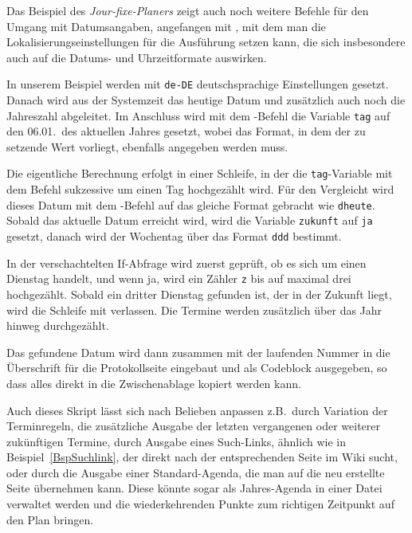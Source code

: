 Das Beispiel des \emph{Jour-fixe-Planers} zeigt auch noch weitere Befehle für den Umgang mit Datumsangaben, angefangen mit , mit dem man die Lokalisierungseinstellungen für die Ausführung setzen kann, die sich insbesondere auch auf die Datums- und Uhrzeitformate auswirken.

In unserem Beispiel werden mit \verb|de-DE| deutschsprachige Einstellungen gesetzt. Danach wird aus der Systemzeit das heutige Datum und zusätzlich auch noch die Jahreszahl abgeleitet. Im Anschluss wird mit dem -Befehl die Variable \verb|tag| auf den 06.01.\ des aktuellen Jahres gesetzt, wobei das Format, in dem der zu setzende Wert vorliegt, ebenfalls angegeben werden muss.

Die eigentliche Berechnung erfolgt in einer Schleife, in der die \verb|tag|-Variable mit dem Befehl  sukzessive um einen Tag hochgezählt wird. Für den Vergleicht wird dieses Datum mit dem -Befehl auf das gleiche Format gebracht wie \verb|dheute|. Sobald das aktuelle Datum erreicht wird, wird die Variable \verb|zukunft| auf \verb|ja| gesetzt, danach wird der Wochentag über das Format \verb|ddd| bestimmt.

In der verschachtelten If-Abfrage wird zuerst geprüft, ob es sich um einen Dienstag handelt, und wenn ja, wird ein Zähler \verb|z| bis auf maximal drei hochgezählt. Sobald ein dritter Dienstag gefunden ist, der in der Zukunft liegt, wird die Schleife mit  verlassen. Die Termine werden zusätzlich über das Jahr hinweg durchgezählt.

Das gefundene Datum wird dann zusammen mit der laufenden Nummer in die Überschrift für die Protokollseite eingebaut und als Codeblock ausgegeben, so dass alles direkt in die Zwischenablage kopiert werden kann.

Auch dieses Skript lässt sich nach Belieben anpassen z.B.\ durch Variation der Terminregeln, die zusätzliche Ausgabe der letzten vergangenen oder weiterer zukünftigen Termine, durch Ausgabe eines Such-Links, ähnlich wie in Beispiel~\ref{BspSuchlink}, der direkt nach der entsprechenden Seite im Wiki sucht, oder durch die Ausgabe einer Standard-Agenda, die man auf die neu erstellte Seite übernehmen kann. Diese könnte sogar als Jahres-Agenda in einer Datei verwaltet werden und die wiederkehrenden Punkte zum richtigen Zeitpunkt auf den Plan bringen.

